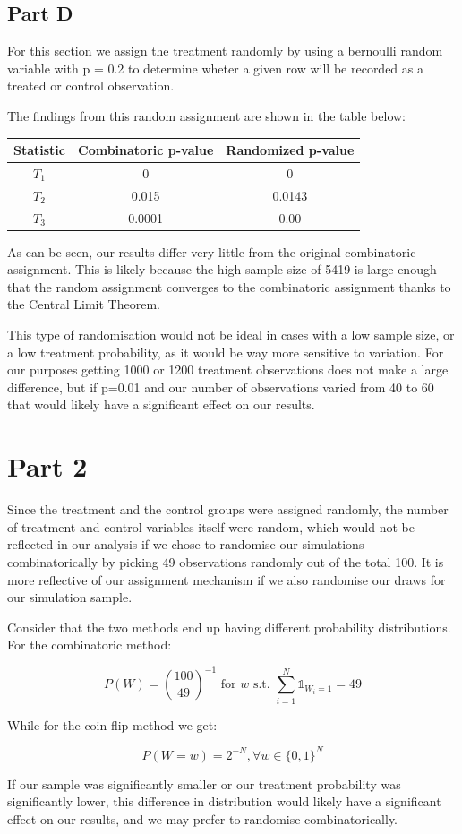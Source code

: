 \documentclass[12pt]{article}
\begin{document}
\subsection{Part D}

For this section we assign the treatment randomly by using a bernoulli random variable with p = 0.2 to determine wheter a given row will be recorded as a treated or control observation. 
\newline

The findings from this random assignment are shown in the table below:

\begin{center}
\begin{tabular}{|c | c | c |} 
 \hline
 Statistic & Combinatoric p-value & Randomized p-value  \\ [0.5ex] 
 \hline
 $T_1$ & 0 & 0  \\ [0.5ex]
 \hline
 $T_2$ & 0.015 & 0.0143  \\ [0.5ex]
 \hline
 $T_3$ & 0.0001 & 0.00 \\ [0.5ex] 
 \hline
\end{tabular}
\end{center}


As can be seen, our results differ very little from the original combinatoric assignment. This is likely because the high sample size of 5419 is large enough that the random assignment converges to the combinatoric assignment thanks to the Central Limit Theorem.

This type of randomisation would not be ideal in cases with a low sample size, or a low treatment probability, as it would be way more sensitive to variation. For our purposes getting 1000 or 1200 treatment observations does not make a large difference, but if p=0.01 and our number of observations varied from 40 to 60 that would likely have a significant effect on our results.

\section{Part 2}

Since the treatment and the control groups were assigned randomly, the number of treatment and control variables itself were random, which would not be reflected in our analysis if we chose to randomise our simulations combinatorically by picking 49 observations randomly out of the total 100. It is more reflective of our assignment mechanism if we also randomise our draws for our simulation sample. 

Consider that the two methods end up having different probability distributions. For the combinatoric method:

\[P(W) = \binom{100}{49}^{-1} \text{ for } w \text{ s.t. }  \sum_{i=1}^N \mathds{1}_{W_i=1} = 49 \]

While for the coin-flip method we get:

\[P(W=w) = 2^{-N}, \forall w \in \{0,1\}^N \]

If our sample was significantly smaller or our treatment probability was significantly lower, this difference in distribution would likely have a significant effect on our results, and we may prefer to randomise combinatorically.
\end{document}
